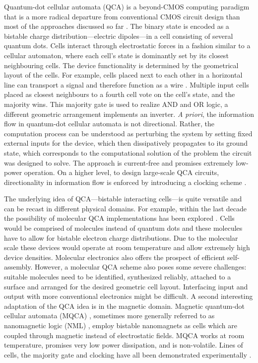 Quantum-dot cellular automata (QCA) is a beyond-CMOS computing paradigm that is
a more radical departure from conventional CMOS circuit design than most of the
approaches discussed so far \cite{lent1993quantum}. The binary state is encoded
as a bistable charge distribution---electric dipoles---in a cell consisting of
several quantum dots.  Cells interact through electrostatic forces in a fashion
similar to a cellular automaton, where each cell's state is dominantly set by
its closest neighbouring cells. The device functionality is determined by the
geometrical layout of the cells. For example, cells placed next to each other in
a horizontal line can transport a signal and therefore function as a wire
\cite{lent1993lines}. Multiple input cells placed as closest neighbours to a
fourth cell vote on the cell's state, and the majority wins.  This majority gate
is used to realize AND and OR logic, a different geometric arrangement
implements an inverter. \emph{A priori}, the information flow in quantum-dot
cellular automata is not directional. Rather, the computation process can be
understood as perturbing the system by setting fixed external inputs for the
device, which then dissipatively propagates to its ground state, which
corresponds to the computational solution of the problem the circuit was
designed to solve. The approach is current-free and promises extremely low-power
operation. On a higher level, to design large-scale QCA circuits, directionality
in information flow is enforced by introducing a clocking scheme
\cite{lent1997device}.

The underlying idea of QCA---bistable interacting cells---is quite versatile and
can be recast in different physical domains. For example, within the last decade
the possibility of molecular QCA implementations has been explored
\cite{lent2000bypassing} \cite{lent2003molecular}. Cells would be comprised of
molecules instead of quantum dots and these molecules have to allow for bistable
electron charge distributions. Due to the molecular scale these devices would
operate at room temperature and allow extremely high device densities. Molecular
electronics also offers the prospect of efficient self-assembly. However, a
molecular QCA scheme also poses some severe challenges: suitable molecules need
to be identified, synthesized reliably, attached to a surface and arranged for
the desired geometric cell layout.  Interfacing input and output with more
conventional electronics might be difficult. A second interesting adaptation of
the QCA idea is in the magnetic domain. Magnetic quantum-dot cellular automata
(MQCA) \cite{cowburn2000room} \cite{bernstein2005magnetic}, sometimes more
generally referred to as nanomagnetic logic (NML) \cite{cavin2012science},
employ bistable nanomagnets as cells which are coupled through magnetic instead
of electrostatic fields. MQCA works at room temperature, promises very low power
dissipation, and is non-volatile.  Lines of cells, the majority gate and
clocking have all been demonstrated experimentally \cite{imre2006majority}
\cite{alam2007clocking} \cite{alam2012chip}.


